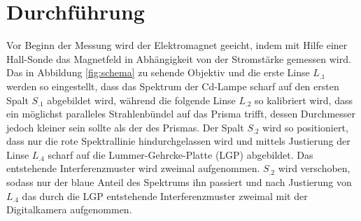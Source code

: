 
\section{Durchführung}
\label{sec:Durchführung}
Vor Beginn der Messung wird der Elektromagnet geeicht, indem mit Hilfe einer Hall-Sonde das Magnetfeld in Abhängigkeit von der Stromstärke gemessen wird. Das in Abbildung \ref{fig:schema} zu sehende Objektiv und die erste Linse $L_.1$ werden so eingestellt, dass das Spektrum der Cd-Lampe scharf auf den ersten Spalt $S_.1$ abgebildet wird, während die folgende Linse $L_.2$ so kalibriert wird, dass ein möglichst paralleles Strahlenbündel auf das Prisma trifft, dessen Durchmesser jedoch kleiner sein sollte als der des Prismas.
Der Spalt $S_.2$ wird so positioniert, dass nur die rote Spektrallinie hindurchgelassen wird und mittels Justierung der Linse $L_.4$ scharf auf die Lummer-Gehrcke-Platte (LGP) abgebildet. Das entstehende
Interferenzmuster wird zweimal aufgenommen.
$S_.2$ wird verschoben, sodass nur der blaue Anteil des Spektrums ihn passiert und nach Justierung von $L_.4$ das durch die LGP entstehende Interferenzmuster zweimal mit der Digitalkamera aufgenommen.

